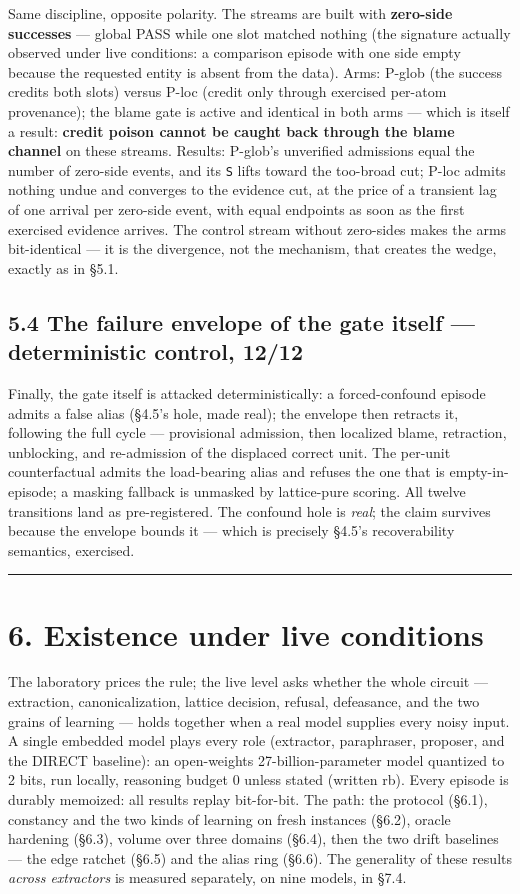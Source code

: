 \documentclass[11pt]{article}
\begin{document}
Same discipline, opposite polarity. The streams are built with \textbf{zero-side successes} — global PASS while one slot matched nothing (the signature actually observed under live conditions: a comparison episode with one side empty because the requested entity is absent from the data). Arms: P-glob (the success credits both slots) versus P-loc (credit only through exercised per-atom provenance); the blame gate is active and identical in both arms — which is itself a result: \textbf{credit poison cannot be caught back through the blame channel} on these streams. Results: P-glob's unverified admissions equal the number of zero-side events, and its \texttt{S} lifts toward the too-broad cut; P-loc admits nothing undue and converges to the evidence cut, at the price of a transient lag of one arrival per zero-side event, with equal endpoints as soon as the first exercised evidence arrives. The control stream without zero-sides makes the arms bit-identical — it is the divergence, not the mechanism, that creates the wedge, exactly as in §5.1.

\subsection*{5.4 The failure envelope of the gate itself — deterministic control, 12/12}

Finally, the gate itself is attacked deterministically: a forced-confound episode admits a false alias (§4.5's hole, made real); the envelope then retracts it, following the full cycle — provisional admission, then localized blame, retraction, unblocking, and re-admission of the displaced correct unit. The per-unit counterfactual admits the load-bearing alias and refuses the one that is empty-in-episode; a masking fallback is unmasked by lattice-pure scoring. All twelve transitions land as pre-registered. The confound hole is \emph{real}; the claim survives because the envelope bounds it — which is precisely §4.5's recoverability semantics, exercised.

\medskip\hrule\medskip

\section*{6. Existence under live conditions}

The laboratory prices the rule; the live level asks whether the whole circuit — extraction, canonicalization, lattice decision, refusal, defeasance, and the two grains of learning — holds together when a real model supplies every noisy input. A single embedded model plays every role (extractor, paraphraser, proposer, and the DIRECT baseline): an open-weights 27-billion-parameter model quantized to 2 bits, run locally, reasoning budget 0 unless stated (written rb). Every episode is durably memoized: all results replay bit-for-bit. The path: the protocol (§6.1), constancy and the two kinds of learning on fresh instances (§6.2), oracle hardening (§6.3), volume over three domains (§6.4), then the two drift baselines — the edge ratchet (§6.5) and the alias ring (§6.6). The generality of these results \emph{across extractors} is measured separately, on nine models, in §7.4.
\end{document}
